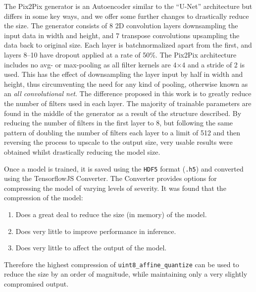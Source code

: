 \documentclass[a4paper]{article}
\begin{document}
The Pix2Pix generator is an Autoencoder similar to the ``U-Net'' architecture\cite{1505.04597} but differs in some key ways, and we offer some further changes to drastically reduce the size. The generator consists of 8 2D convolution layers downsampling the input data in width and height, and 7 transpose convolutions upsampling the data back to original size. Each layer is batchnormalized\cite{1502.03167} apart from the first, and layers 8--10 have dropout\cite{JMLR:v15:srivastava14a} applied at a rate of 50\%. The Pix2Pix architecture includes no avg- or max-pooling as all filter kernels are 4$\times$4 and a stride of 2 is used. This has the effect of downsampling the layer input by half in width and height, thus circumventing the need for any kind of pooling, otherwise known as an \textit{all convolutional net}\cite{1412.6806}. The difference proposed in this work is to greatly reduce the number of filters used in each layer. The majority of trainable parameters are found in the middle of the generator as a result of the structure described. By reducing the number of filters in the first layer to 8, but following the same pattern of doubling the number of filters each layer to a limit of 512 and then reversing the process to upscale to the output size, very usable results were obtained whilst drastically reducing the model size.

Once a model is trained, it is saved using the \verb|HDF5| format (\verb|.h5|) and converted using the TensorflowJS Converter. The Converter provides options for compressing the model of varying levels of severity. It was found that the compression of the model:

\begin{enumerate}
	\item Does a great deal to reduce the size (in memory) of the model.
	\item Does very little to improve performance in inference.
	\item Does very little to affect the output of the model.
\end{enumerate}

Therefore the highest compression of \verb|uint8_affine_quantize| can be used to reduce the size by an order of magnitude, while maintaining only a very slightly compromised output.
\end{document}
